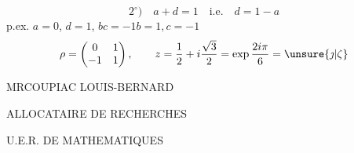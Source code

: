 \[
2^\circ)\quad a+d=1\quad\text{i.e.}\quad d=1-a
\]
p.ex. $a=0$, $d=1$, $bc=-1$\qquad$b=1,c=-1$
\[
\rho=\begin{pmatrix}0&1\\-1&1\end{pmatrix},\qquad
z=\frac12+i\frac{\sqrt3}{2}=\exp\frac{2i\pi}{6}=\unsure{\jmath|\zeta}
\]

MR\quad COUPIAC LOUIS-BERNARD

ALLOCATAIRE DE RECHERCHES


U.E.R. DE MATHEMATIQUES
